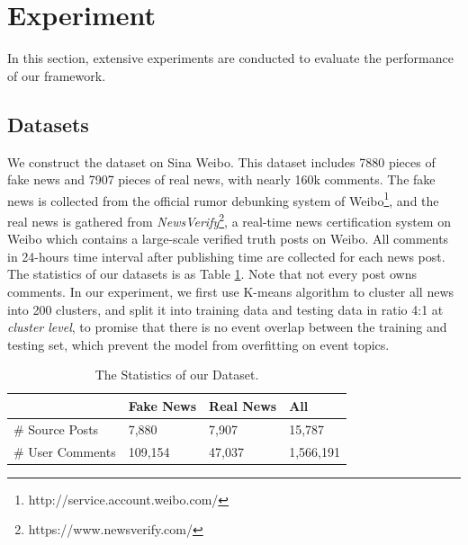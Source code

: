 \documentclass{article}
\newcommand{\kai}[1]{\textcolor{blue}{Kai: {#1}}}
\begin{document}
	
	\section{Experiment}
	In this section, extensive experiments are conducted to evaluate the performance of our framework. 
	
	\subsection{Datasets}\label{sec:data}
	We construct the dataset on Sina Weibo. This dataset includes 7880 pieces of fake news and 7907 pieces of real news, with nearly 160k comments. The fake news is collected from the official rumor debunking system of Weibo\footnote{http://service.account.weibo.com/}, and the real news is gathered from {\em NewsVerify}\footnote{https://www.newsverify.com/}, a real-time news certification system on Weibo which contains a large-scale verified truth posts on Weibo\cite{zhou2015real}. All comments in 24-hours time interval after publishing time are collected for each news post. The statistics of our datasets is as Table \ref{tab:dataset}. Note that not every post owns comments. In our experiment, we first use K-means algorithm to cluster all news into 200 clusters, and split it into training data and testing data in ratio 4:1 at {\em cluster level}, to promise that there is no event overlap between the training and testing set, which prevent the model from overfitting on event topics. 
	
	\begin{table}[!htb]
		\centering
		\begin{tabular}{llll}
			\toprule
			\ &Fake News & Real News & All\\
			\midrule
			\# Source Posts & 7,880    & 7,907  & 15,787   \\
			\midrule
			\# User Comments & 109,154  & 47,037 & 1,566,191\\
			\bottomrule
		\end{tabular}
		\caption{The Statistics of our Dataset.}
		\label{tab:dataset}
		\vspace{-0.3cm}
	\end{table}
	
\end{document}
